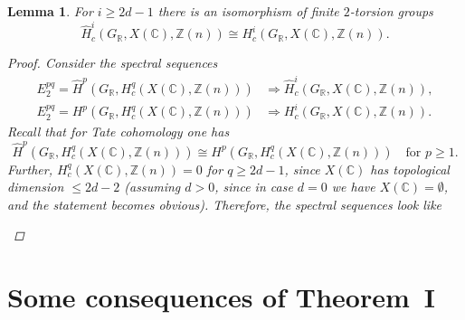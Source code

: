 \documentclass[draft,leqno,12pt]{article}
\theoremstyle{plain}
\newtheorem{lemma}[theorem]{\indent\sc Lemma}
\theoremstyle{definition}
\newcommand{\ZZ}{\mathbb{Z}}
\newcommand{\RR}{\mathbb{R}}
\newcommand{\CC}{\mathbb{C}}
\begin{document}
\begin{lemma}
  \label{lemma:Tate-vs-normal-cohomology-of-X(C)}
  For $i \ge 2d - 1$ there is an isomorphism of finite $2$-torsion groups
  \[ \widehat{H}^i_c (G_\RR, X (\CC), \ZZ(n)) \cong
    H^i_c (G_\RR, X (\CC), \ZZ(n)). \]

  \begin{proof}
    Consider the spectral sequences
    \begin{align*}
      E^{pq}_2 = \widehat{H}^p (G_\RR, H^q_c (X (\CC), \ZZ(n))) & \Longrightarrow
      \widehat{H}^i_c (G_\RR, X (\CC), \ZZ(n)), \\
      E^{pq}_2 = H^p (G_\RR, H^q_c (X (\CC), \ZZ(n))) & \Longrightarrow
      H^i_c (G_\RR, X (\CC), \ZZ(n)).
    \end{align*}
    Recall that for Tate cohomology one has
    \[ \widehat{H}^p (G_\RR, H^q_c (X (\CC), \ZZ(n))) \cong
      H^p (G_\RR, H^q_c (X (\CC), \ZZ(n)))
      \quad\text{for }p \ge 1. \]
    Further, $H^q_c (X (\CC), \ZZ(n)) = 0$
    for $q \ge 2d-1$, since $X (\CC)$ has topological dimension $\le 2d - 2$
    (assuming $d > 0$, since in case $d = 0$ we have $X (\CC) = \emptyset$, and
    the statement becomes obvious).  Therefore, the spectral sequences look like
    \begin{center}
    \end{center}
  \end{proof}
\end{lemma}


\section{Some consequences of Theorem~I}
\label{sec:consequences-of-theorem-I}
\end{document}
